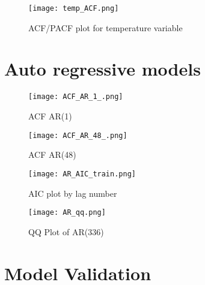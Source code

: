 \documentclass[11pt]{article}
\begin{document}
\begin{figure}[H]
\centering
\begin{minipage}{.9\textwidth}
  \centering
  \texttt{[image: temp\_ACF.png]}
   \caption{ACF/PACF plot for temperature variable}
   \label{fig:temp_PCF}
\end{minipage}%
\end{figure}

\section{Auto regressive models}
\label{appendix:auto_regressive_models}

\begin{figure}[H]
\centering
\begin{minipage}{.75\textwidth}
  \centering
  \texttt{[image: ACF\_AR\_1\_.png]}
   \caption{ACF AR(1)}
   \label{fig:ACF_plot_AR(1)}
\end{minipage}%
\end{figure}

\begin{figure}[H]
\centering
\begin{minipage}{.75\textwidth}
  \centering
  \texttt{[image: ACF\_AR\_48\_.png]}
   \caption{ACF AR(48)}
   \label{fig:ACF plot for AR(48)}
\end{minipage}%
\end{figure}

\begin{figure}[H]
\centering
\begin{minipage}{.5\textwidth}
  \centering
  \texttt{[image: AR\_AIC\_train.png]}
   \caption{AIC plot by lag number}
   \label{fig:AR_AIC_train}
\end{minipage}%
\end{figure}

\begin{figure}[H]
\centering
\begin{minipage}{.5\textwidth}
  \centering
  \texttt{[image: AR\_qq.png]}
   \caption{QQ Plot of AR(336)}
   \label{fig:QQ Plot of AR(336)}
\end{minipage}%
\end{figure}

\section{Model Validation}
\label{appendix:model_validation}
\end{document}
